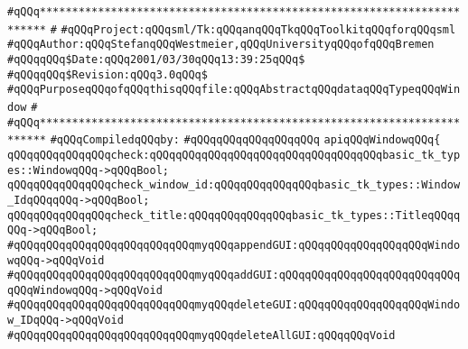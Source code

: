 \label{src/lib/tk/src/windows.api}
\verb|#qQQq***********************************************************************|\newline
\verb|#|\newline
\verb|#qQQqProject:qQQqsml/Tk:qQQqanqQQqTkqQQqToolkitqQQqforqQQqsml|\newline
\verb|#qQQqAuthor:qQQqStefanqQQqWestmeier,qQQqUniversityqQQqofqQQqBremen|\newline
\verb|#qQQqqQQq$Date:qQQq2001/03/30qQQq13:39:25qQQq$|\newline
\verb|#qQQqqQQq$Revision:qQQq3.0qQQq$|\newline
\verb|#qQQqPurposeqQQqofqQQqthisqQQqfile:qQQqAbstractqQQqdataqQQqTypeqQQqWindow|\newline
\verb|#|\newline
\verb|#qQQq***********************************************************************|\newline
\newline
\verb|#qQQqCompiledqQQqby:|\newline
\verb|#qQQqqQQqqQQqqQQqqQQq|\newline
\newline
\verb|apiqQQqWindowqQQq{|\newline
\newline
\verb|qQQqqQQqqQQqqQQqcheck:qQQqqQQqqQQqqQQqqQQqqQQqqQQqqQQqqQQqbasic_tk_types::WindowqQQq->qQQqBool;|\newline
\newline
\verb|qQQqqQQqqQQqqQQqcheck_window_id:qQQqqQQqqQQqqQQqbasic_tk_types::Window_IdqQQqqQQq->qQQqBool;|\newline
\verb|qQQqqQQqqQQqqQQqcheck_title:qQQqqQQqqQQqqQQqbasic_tk_types::TitleqQQqqQQq->qQQqBool;|\newline
\newline
\newline
\verb|#qQQqqQQqqQQqqQQqqQQqqQQqqQQqmyqQQqappendGUI:qQQqqQQqqQQqqQQqqQQqWindowqQQq->qQQqVoid|\newline
\verb|#qQQqqQQqqQQqqQQqqQQqqQQqqQQqmyqQQqaddGUI:qQQqqQQqqQQqqQQqqQQqqQQqqQQqqQQqWindowqQQq->qQQqVoid|\newline
\verb|#qQQqqQQqqQQqqQQqqQQqqQQqqQQqmyqQQqdeleteGUI:qQQqqQQqqQQqqQQqqQQqWindow_IDqQQq->qQQqVoid|\newline
\verb|#qQQqqQQqqQQqqQQqqQQqqQQqqQQqmyqQQqdeleteAllGUI:qQQqqQQqVoid|\newline
\newline
\newline
